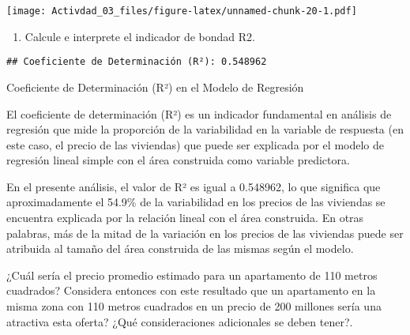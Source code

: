 \documentclass[
]{article}
\newenvironment{Shaded}{\begin{snugshade}}{\end{snugshade}}
\newcommand{\CommentTok}[1]{\textcolor[rgb]{0.56,0.35,0.01}{\textit{#1}}}
\newcommand{\FunctionTok}[1]{\textcolor[rgb]{0.13,0.29,0.53}{\textbf{#1}}}
\newcommand{\NormalTok}[1]{#1}
\newcommand{\OtherTok}[1]{\textcolor[rgb]{0.56,0.35,0.01}{#1}}
\newcommand{\SpecialCharTok}[1]{\textcolor[rgb]{0.81,0.36,0.00}{\textbf{#1}}}
\newcommand{\StringTok}[1]{\textcolor[rgb]{0.31,0.60,0.02}{#1}}
\providecommand{\tightlist}{%
  \setlength{\itemsep}{0pt}\setlength{\parskip}{0pt}}
\begin{document}
\texttt{[image: Activdad\_03\_files/figure-latex/unnamed-chunk-20-1.pdf]}

\begin{enumerate}
\def\labelenumi{\arabic{enumi}.}
\setcounter{enumi}{5}
\tightlist
\item
  Calcule e interprete el indicador de bondad R2.
\end{enumerate}

\begin{Shaded}
\end{Shaded}

\begin{verbatim}
## Coeficiente de Determinación (R²): 0.548962
\end{verbatim}

Coeficiente de Determinación (R²) en el Modelo de Regresión

El coeficiente de determinación (R²) es un indicador fundamental en
análisis de regresión que mide la proporción de la variabilidad en la
variable de respuesta (en este caso, el precio de las viviendas) que
puede ser explicada por el modelo de regresión lineal simple con el área
construida como variable predictora.

En el presente análisis, el valor de R² es igual a 0.548962, lo que
significa que aproximadamente el 54.9\% de la variabilidad en los
precios de las viviendas se encuentra explicada por la relación lineal
con el área construida. En otras palabras, más de la mitad de la
variación en los precios de las viviendas puede ser atribuida al tamaño
del área construida de las mismas según el modelo.

¿Cuál sería el precio promedio estimado para un apartamento de 110
metros cuadrados? Considera entonces con este resultado que un
apartamento en la misma zona con 110 metros cuadrados en un precio de
200 millones sería una atractiva esta oferta? ¿Qué consideraciones
adicionales se deben tener?.
\end{document}
